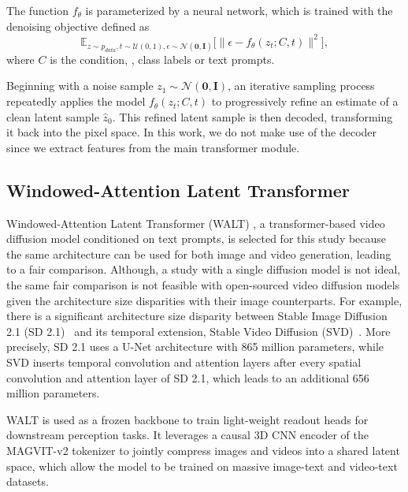 The function $f_\theta$ is parameterized by a neural network, which is trained with the denoising objective defined as 
\begin{equation*}
\mathbb{E}_{z{\sim}p_{data}, t\sim \mathcal{U}(0, 1), \epsilon \sim \mathcal{N}(\mathbf{0}, \mathbf{I})} \big[\|\epsilon - f_{\theta} (z_t; C, t)\|^2\big],
\end{equation*}
where $C$ is the condition, \eg, class labels or text prompts.

Beginning with a noise sample $z_1 \sim \mathcal{N}(\mathbf{0}, \mathbf{I})$, an iterative sampling process repeatedly applies the model $f_\theta(z_t; C, t)$ to progressively refine an estimate of a clean latent sample $\hat{z}_0$.  This refined latent sample is then decoded, transforming it back into the pixel space.
In this work, we do not make use of the decoder since we extract features from the main transformer module.

\subsection{Windowed-Attention Latent Transformer}
\label{sec:method:walt}

Windowed-Attention Latent Transformer (WALT) \cite{walt}, a transformer-based video diffusion model conditioned on text prompts, is selected for this study because the same architecture can be used for both image and video generation, leading to a fair comparison. Although, a study with a single diffusion model is not ideal, the same fair comparison is not feasible with open-sourced video diffusion models given the architecture size disparities with their image counterparts. For example, there is a significant architecture size disparity between Stable Image Diffusion 2.1 (SD 2.1)~\cite{rombach2022high} and its temporal extension, Stable Video Diffusion (SVD)~\cite{blattmann2023stable}. More precisely, SD 2.1 uses a U-Net architecture with 865 million parameters, while SVD  inserts temporal convolution and attention layers after every spatial convolution and attention layer of SD 2.1, which leads to an additional 656 million parameters.






WALT is used as a frozen backbone to train light-weight readout heads for downstream perception tasks. It leverages a causal 3D CNN encoder of the MAGVIT-v2 tokenizer \cite{magvitv2} to jointly compress images and videos into a shared latent space, which allow the model to be trained on massive image-text and video-text datasets.



